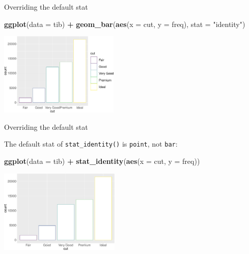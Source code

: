 \documentclass[ignorenonframetext,]{beamer}
\newenvironment{Shaded}{\begin{snugshade}}{\end{snugshade}}
\newcommand{\DataTypeTok}[1]{\textcolor[rgb]{0.13,0.29,0.53}{#1}}
\newcommand{\KeywordTok}[1]{\textcolor[rgb]{0.13,0.29,0.53}{\textbf{#1}}}
\newcommand{\NormalTok}[1]{#1}
\newcommand{\OperatorTok}[1]{\textcolor[rgb]{0.81,0.36,0.00}{\textbf{#1}}}
\newcommand{\StringTok}[1]{\textcolor[rgb]{0.31,0.60,0.02}{#1}}
\begin{document}
\begin{frame}[fragile]{Overriding the default stat}
\protect\hypertarget{overriding-the-default-stat}{}

\begin{Shaded}
\begin{Highlighting}[]
\KeywordTok{ggplot}\NormalTok{(}\DataTypeTok{data =}\NormalTok{ tib) }\OperatorTok{+}
\StringTok{  }\KeywordTok{geom_bar}\NormalTok{(}\KeywordTok{aes}\NormalTok{(}\DataTypeTok{x =}\NormalTok{ cut, }\DataTypeTok{y =}\NormalTok{ freq),}
    \DataTypeTok{stat =} \StringTok{"identity"}\NormalTok{)}
\end{Highlighting}
\end{Shaded}

\begin{center}\includegraphics[height=150px]{data-visualization_files/figure-beamer/unnamed-chunk-124-1} \end{center}

\end{frame}

\begin{frame}[fragile]{Overriding the default stat}
\protect\hypertarget{overriding-the-default-stat-1}{}

The default stat of \texttt{stat\_identity()} is \texttt{point}, not
\texttt{bar}:

\begin{Shaded}
\begin{Highlighting}[]
\KeywordTok{ggplot}\NormalTok{(}\DataTypeTok{data =}\NormalTok{ tib) }\OperatorTok{+}
\StringTok{  }\KeywordTok{stat_identity}\NormalTok{(}\KeywordTok{aes}\NormalTok{(}\DataTypeTok{x =}\NormalTok{ cut, }\DataTypeTok{y =}\NormalTok{ freq))}
\end{Highlighting}
\end{Shaded}

\begin{center}\includegraphics[height=150px]{data-visualization_files/figure-beamer/unnamed-chunk-125-1} \end{center}

\end{frame}
\end{document}
